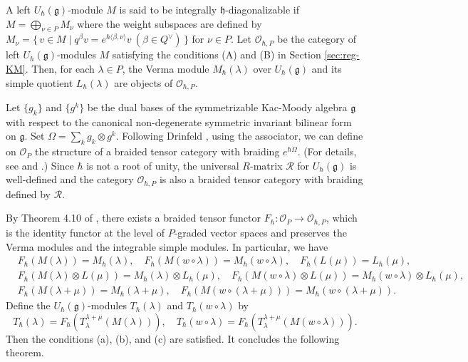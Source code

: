 \documentclass[12pt,twoside]{article}
\newcommand\bra{\langle}
\newcommand\ket{\rangle}
\renewcommand\O{{\mathcal O}}
\newcommand\Qv{Q^\vee}
\newcommand\g{{\mathfrak g}}
\newcommand\h{{\mathfrak h}}
\newcommand\intpart{P}
\newcommand\Oint{\O_\intpart}
\newcommand\Ointh{\O_{\hbar,\intpart}}
\theoremstyle{plain} %
\theoremstyle{definition} %
\theoremstyle{definition} %
\numberwithin{theorem}{section}
\numberwithin{equation}{section}
\numberwithin{figure}{section}
\numberwithin{table}{section}
\newcommand\secref[1]{Section \ref{#1}}
\begin{document}
A left $U_\hbar(\g)$-module $M$ is said to be integrally $\h$-diagonalizable 
if $M=\bigoplus_{\nu\in P}M_\nu$ where the weight subspaces are defined 
by $M_\nu=\{\,v\in M\mid q^\beta v=e^{\hbar\bra\beta,\nu\ket}v\ (\beta\in\Qv) \,\}$
for $\nu\in P$.
Let $\Ointh$ be the category of left $U_\hbar(\g)$-modules $M$ satisfying 
the conditions (A) and (B) in \secref{sec:reg-KM}.
Then, for each $\lambda\in P$, the Verma module $M_\hbar(\lambda)$ over $U_\hbar(\g)$ 
and its simple quotient $L_\hbar(\lambda)$ are objects of $\Ointh$.

Let $\{g_k\}$ and $\{g^k\}$ be the dual bases 
of the symmetrizable Kac-Moody algebra $\g$ with respect to 
the canonical non-degenerate symmetric invariant bilinear form on $\g$.
Set $\Omega = \sum_k g_k\otimes g^k$. 
Following Drinfeld \cite{Drinfeld}, using the associator, 
we can define on $\Oint$ the structure of a braided tensor category 
with braiding $e^{\hbar\Omega}$.
(For details, see \cite{Drinfeld} and \cite{EK-I}.)
Since $\hbar$ is not a root of unity, 
the universal $R$-matrix $\mathcal{R}$ for $U_\hbar(\g)$ is well-defined and 
the category $\Ointh$ is also a braided tensor category with 
braiding defined by $\mathcal{R}$.

By Theorem 4.10 of \cite{EK-VI},
there exists a braided tensor functor $F_\hbar:\Oint\to\Ointh$,
which is the identity functor at the level of $P$-graded vector spaces
and preserves the Verma modules and the integrable simple modules.
In particular, we have
\begin{align*}
 &
 F_\hbar(M(\lambda)) = M_\hbar(\lambda), \quad
 F_\hbar(M(w\circ\lambda)) = M_\hbar(w\circ\lambda), \quad
 F_\hbar(L(\mu)) = L_\hbar(\mu),
 \\ &
 F_\hbar(M(\lambda)\otimes L(\mu)) = M_\hbar(\lambda)\otimes L_\hbar(\mu), \quad
 F_\hbar(M(w\circ\lambda)\otimes L(\mu)) = M_\hbar(w\circ\lambda)\otimes L_\hbar(\mu),
 \\ &
 F_\hbar(M(\lambda+\mu)) = M_\hbar(\lambda+\mu), \quad
 F_\hbar(M(w\circ(\lambda+\mu))) = M_\hbar(w\circ(\lambda+\mu)).
\end{align*}
Define the $U_\hbar(\g)$-modules 
$T_\hbar(\lambda)$ and $T_\hbar(w\circ\lambda)$ by
\begin{equation*}
 T_\hbar(\lambda) = F_\hbar(T_\lambda^{\lambda+\mu}(M(\lambda))), \quad
 T_\hbar(w\circ\lambda) = F_\hbar(T_\lambda^{\lambda+\mu}(M(w\circ\lambda))).
\end{equation*}
Then the conditions (a), (b), and (c) are satisfied.
It concludes the following theorem.
\end{document}
